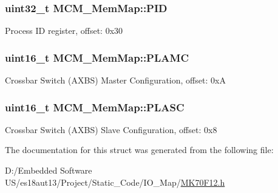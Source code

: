 \subsubsection[{P\+I\+D}]{\setlength{\rightskip}{0pt plus 5cm}uint32\+\_\+t M\+C\+M\+\_\+\+Mem\+Map\+::\+P\+I\+D}\label{struct_m_c_m___mem_map_a41b1890f596f706bcd94c2d49c1e44f7}
Process I\+D register, offset\+: 0x30 \hypertarget{struct_m_c_m___mem_map_a7d749b910777a6b67ea94f2379c628ee}{}
\subsubsection[{P\+L\+A\+M\+C}]{\setlength{\rightskip}{0pt plus 5cm}uint16\+\_\+t M\+C\+M\+\_\+\+Mem\+Map\+::\+P\+L\+A\+M\+C}\label{struct_m_c_m___mem_map_a7d749b910777a6b67ea94f2379c628ee}
Crossbar Switch (A\+X\+B\+S) Master Configuration, offset\+: 0x\+A \hypertarget{struct_m_c_m___mem_map_ad68f64d82524bb0b181a837967b8e248}{}
\subsubsection[{P\+L\+A\+S\+C}]{\setlength{\rightskip}{0pt plus 5cm}uint16\+\_\+t M\+C\+M\+\_\+\+Mem\+Map\+::\+P\+L\+A\+S\+C}\label{struct_m_c_m___mem_map_ad68f64d82524bb0b181a837967b8e248}
Crossbar Switch (A\+X\+B\+S) Slave Configuration, offset\+: 0x8 

The documentation for this struct was generated from the following file\+:\begin{DoxyCompactItemize}
\item 
D\+:/\+Embedded Software U\+S/es18aut13/\+Project/\+Static\+\_\+\+Code/\+I\+O\+\_\+\+Map/\hyperlink{_m_k70_f12_8h}{M\+K70\+F12.\+h}\end{DoxyCompactItemize}
